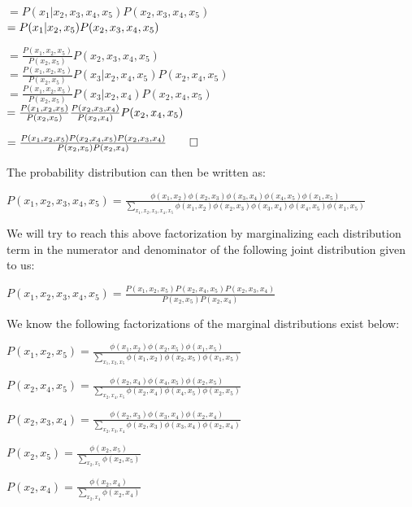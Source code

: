 \documentclass[12pt]{article}
\begin{document}
$= P(x_1 \vert x_2, x_3, x_4, x_5)P(x_2, x_3, x_4, x_5)$\\

$= P(x_1 \vert x_2, x_5)P(x_2, x_3, x_4, x_5)\\$

$= \frac{P(x_1, x_2, x_5)}{P(x_2, x_5)}P(x_2, x_3, x_4, x_5)$\\

$= \frac{P(x_1, x_2, x_5)}{P(x_2, x_5)}P(x_3 \vert x_2, x_4, x_5)P(x_2, x_4, x_5)$\\

$= \frac{P(x_1, x_2, x_5)}{P(x_2, x_5)}P(x_3 \vert x_2, x_4)P(x_2, x_4, x_5)$\\

$= \frac{P(x_1, x_2, x_5)}{P(x_2, x_5)}\frac{P(x_2, x_3, x_4)}{P(x_2, x_4)}P(x_2, x_4, x_5)\\$

$= \frac{P(x_1, x_2, x_5)P(x_2, x_4, x_5)P(x_2, x_3, x_4)}{P(x_2, x_5)P(x_2, x_4)}\qed\\$

The probability distribution can then be written as:

$P(x_1, x_2, x_3, x_4, x_5) = \frac{\phi(x_1, x_2)\phi(x_2, x_3)\phi(x_3, x_4)\phi(x_4, x_5)\phi(x_1, x_5)}{\sum_{x_1, x_2, x_3, x_4, x_5} \phi(x_1, x_2)\phi(x_2, x_3)\phi(x_3, x_4)\phi(x_4, x_5)\phi(x_1, x_5)}$

We will try to reach this above factorization by marginalizing each distribution term in the numerator and denominator of the following joint distribution given to us:

$P(x_1, x_2, x_3, x_4, x_5) = \frac{P(x_1, x_2, x_5)P(x_2, x_4, x_5)P(x_2, x_3, x_4)}{P(x_2, x_5)P(x_2, x_4)}$

We know the following factorizations of the marginal distributions exist below:

$P(x_1, x_2, x_5) = \frac{\phi(x_1, x_2)\phi(x_2, x_5)\phi(x_1, x_5)}{\sum_{x_1, x_2, x_5} \phi(x_1, x_2)\phi(x_2, x_5)\phi(x_1, x_5)}$

$P(x_2, x_4, x_5) = \frac{\phi(x_2, x_4)\phi(x_4, x_5)\phi(x_2, x_5)}{\sum_{x_2, x_4, x_5} \phi(x_2, x_4)\phi(x_4, x_5)\phi(x_2, x_5)}$

$P(x_2, x_3, x_4) = \frac{\phi(x_2, x_3)\phi(x_3, x_4)\phi(x_2, x_4)}{\sum_{x_2, x_3, x_4} \phi(x_2, x_3)\phi(x_3, x_4)\phi(x_2, x_4)}$

$P(x_2, x_5) = \frac{\phi(x_2, x_5)}{\sum_{x_2, x_5} \phi(x_2, x_5)}$

$P(x_2, x_4) = \frac{\phi(x_2, x_4)}{\sum_{x_2, x_4} \phi(x_2, x_4)}$
\end{document}
